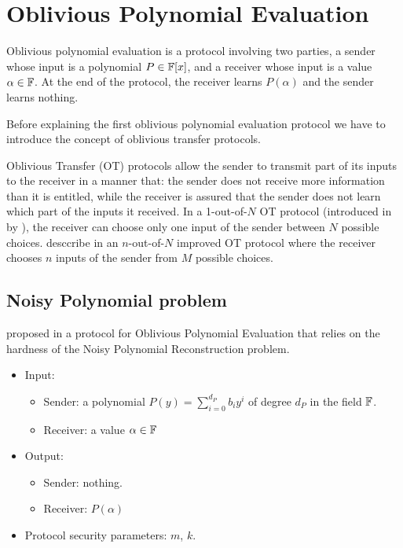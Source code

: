 \section{Oblivious Polynomial Evaluation}
Oblivious polynomial evaluation is a protocol involving two parties, a sender whose input is a polynomial $P \in {\mathbb F}[x]$, and a receiver whose input is a value $\alpha \in {\mathbb F}$. At the end of the protocol, the receiver learns $P(\alpha)$ and the sender learns nothing.

Before explaining the first oblivious polynomial evaluation protocol we have to introduce the concept of oblivious transfer protocols.

Oblivious Transfer (OT) protocols allow the sender to transmit part of its inputs to the receiver in a manner that: the sender does not receive more information than it is entitled, while the receiver is assured that the sender does not learn which part of the inputs it received. In a 1-out-of-$N$ OT protocol (introduced in \cite{BrassardCR86} by \citeauthor{BrassardCR86}), the receiver can choose only one input of the sender between $N$ possible choices. \citeauthor{OT} desccribe in \cite{OT} an $n$-out-of-$N$ improved OT protocol where the receiver chooses $n$ inputs of the sender from $M$ possible choices.

\subsection{Noisy Polynomial problem}

\citeauthor{OPE} proposed in \cite{OPE} a protocol for Oblivious Polynomial Evaluation that relies on the hardness of the Noisy Polynomial Reconstruction problem.

\begin{itemize}
    \item Input:
    
    \begin{itemize}
        \item Sender: a polynomial $P(y) = \sum_{i=0}^{d_P} b_i y^i$ of degree $d_P$ in the field ${\mathbb F}$.
        \item Receiver: a value $\alpha \in {\mathbb F}$
    \end{itemize}
    
    \item Output:
    
    \begin{itemize}
        \item Sender: nothing.
        \item Receiver: $P(\alpha)$
    \end{itemize}
    
    \item Protocol security parameters: $m$, $k$.
    
\end{itemize}


